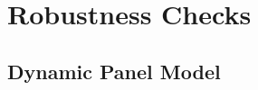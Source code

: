 \documentclass[mnsc,blindrev]{informs3}
\begin{document}
	
	
	
\section{Robustness Checks} \label{Sec: Robustness}
	
\subsection{Dynamic Panel Model}  \label{Sec: Dynamic Panel}
	
\end{document}
